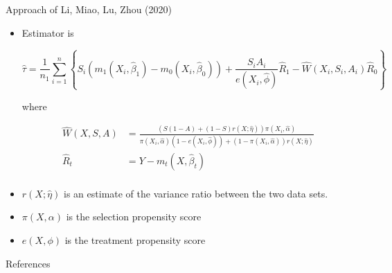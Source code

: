\documentclass[handout]{beamer} %
\begin{document}
\begin{frame}{Approach of Li, Miao, Lu, Zhou (2020)}

{\footnotesize
\begin{itemize}
    \item Estimator is 

      \[\hat \tau = \frac{1}{n_1} \sum_{i = 1}^n \left\{
        S_i(m_1(X_i, \hat \beta_1) - m_0(X_i, \hat \beta_0)) 
        + \frac{S_i A_i}{e(X_i, \hat \phi)}\hat R_1 -
      \hat W(X_i, S_i, A_i) \hat R_0\right\}\]

      where 

      \begin{align*}
      \hat W(X, S, A) &= 
      \frac{(S(1 - A) + (1 - S)r(X;\hat \eta))\pi(X_i, \hat \alpha)}{
      \pi(X_i, \hat \alpha)(1 - e(X_i, \hat \phi)) + 
      (1 - \pi(X_i, \hat \alpha))r(X; \hat \eta)}\\
      \hat R_t &= Y - m_t(X, \hat \beta_t)\\
      \end{align*}
    \item $r(X; \hat \eta)$ is an estimate of the variance ratio between
      the two data sets.
    \item $\pi(X, \alpha)$ is the selection propensity score
    \item $e(X, \phi)$ is the treatment propensity score
\end{itemize}
}

\end{frame}

%
%

\begin{frame}{References}

  \nocite{shi2023data}
  \nocite{degtiar2023review}
  \nocite{yang2019combining}
  \nocite{li2023improving}
  \printbibliography

\end{frame}
\end{document}
